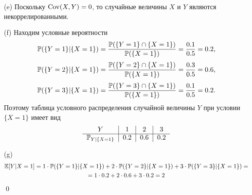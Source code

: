 \documentclass[12pt, a4paper]{article}\usepackage[]{graphicx}\usepackage[]{color}
\begin{document}
(e) Поскольку $\Cov(X,Y) = 0$, то случайные величины $X$ и $Y$ являются некоррелированными.

(f) Находим условные вероятности
\[
\P(\{Y=1\}|\{X=1\}) = \frac{\P(\{Y=1\} \cap \{X=1\})}{\P(\{X=1\})} = \frac{0.1}{0.5} = 0.2 \text{,}
\]
\[
\P(\{Y=2\}|\{X=1\}) = \frac{\P(\{Y=2\} \cap \{X=1\})}{\P(\{X=1\})} = \frac{0.3}{0.5} = 0.6 \text{,}
\]
\[
\P(\{Y=3\}|\{X=1\}) = \frac{\P(\{Y=3\} \cap \{X=1\})}{\P(\{X=1\})} = \frac{0.1}{0.5} = 0.2 \text{.}
\]
Поэтому таблица условного распределения случайной величины $Y$ при условии $\{X = 1\}$ имеет вид
\[
\begin{tabular}{c|c|c|c}
  $Y$                          & $1$     & $2$     & $3$ \\ \cline{1-4}
  $\P_{Y|\{X=1\}}$     & $0.2$   & $0.6$   & $0.2$ \\
\end{tabular}
\]

(g)
\begin{multline}
\E[Y|{X=1}] = 1 \cdot \P(\{Y=1\}|\{X=1\}) + 2 \cdot \P(\{Y=2\}|\{X=1\}) + 3 \cdot \P(\{Y=3\}|\{X=1\}) = \\
= 1 \cdot 0.2 + 2 \cdot 0.6 + 3 \cdot 0.2 = 2
\end{multline}
\qed
\end{document}

